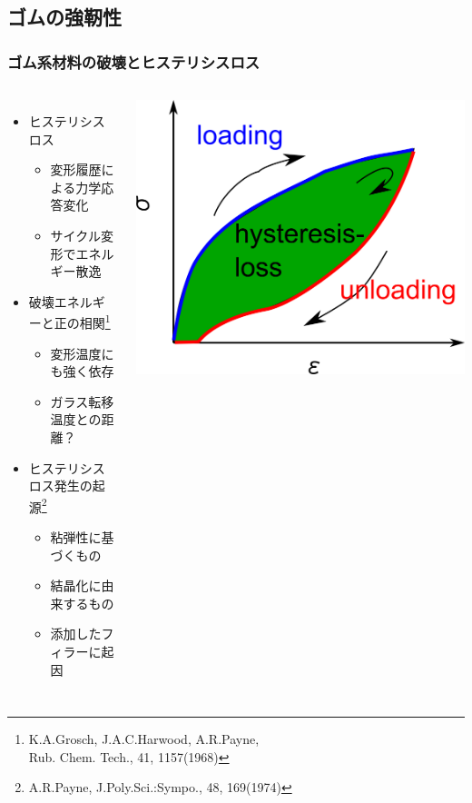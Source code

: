 \documentclass[12pt, dvipdfmx]{beamer}
\begin{document}
\subsection{ゴムの強靭性}
\begin{frame}
	\frametitle{ゴム系材料の破壊とヒステリシスロス}
	\vspace{-1mm}
			\begin{columns}[T, onlytextwidth]
					\begin{itemize}
						\item ヒステリシスロス
							\begin{itemize}
								\item 変形履歴による力学応答変化
								\item サイクル変形でエネルギー散逸
							\end{itemize}
						\item 破壊エネルギーと\alert{正の相関}\footnote{
								\scriptsize{K.A.Grosch, J.A.C.Harwood, A.R.Payne, \\Rub. Chem. Tech., 41, 1157(1968)}
							}
							\begin{itemize}
								\item \alert{変形温度}にも強く依存
								\item ガラス転移温度との距離？
							\end{itemize}
						\item ヒステリシスロス発生の起源\footnote{
							\scriptsize{A.R.Payne, J.Poly.Sci.:Sympo., 48, 169(1974)}
						}
						\begin{itemize}
							\item \alert{粘弾性に基づくもの}
							\color{blue}
							\item 結晶化に由来するもの
							\item 添加したフィラーに起因
						\end{itemize}
					\end{itemize}
				\begin{center}
					\vspace{-2mm}
					\includegraphics[width=\textwidth]{hysteresis_curve.png}


\end{center}
\end{columns}
\end{frame}
\end{document}
